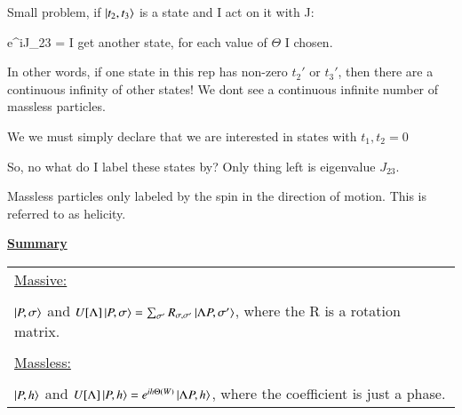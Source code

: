 {Small problem, if $\ket{t_2,t_3}$ is a state and I act on it with J:

\be
e^{i\Theta J_23}  =  
\ee
I get another state, for each value of $\Theta$ I chosen.

In other words, if one state in this rep has non-zero $t_2'$ or $t_3'$, then there are a continuous infinity of other states!
We dont see a continuous infinite number of massless particles. 

We we must simply declare that we are interested in states with $t_1, t_2 = 0$

So, no what do I label these states by?
Only thing left is eigenvalue $J_{23}$.

Massless particles only labeled by the spin in the direction of motion. 
This is referred to as helicity. 

{\Large \underline{\textbf{Summary}}}

\begin{tabular}{l}
\underline{Massive:}\\
\\
\hspace{0.5in}$\ket{P, \sigma}$ and $U[\Lambda] \ket{P, \sigma} = \sum_{\sigma'} R_{\sigma,\sigma'} \ket{\Lambda P, \sigma'}$, where the R is a rotation matrix.\\
\\
\underline{Massless:}\\
\\
\hspace{0.5in}$\ket{P, h}$ and $U[\Lambda] \ket{P, h} = e^{ih\Theta(W)}\ket{\Lambda P, h}$, where the coefficient is just a phase.\\
\end{tabular}

}



